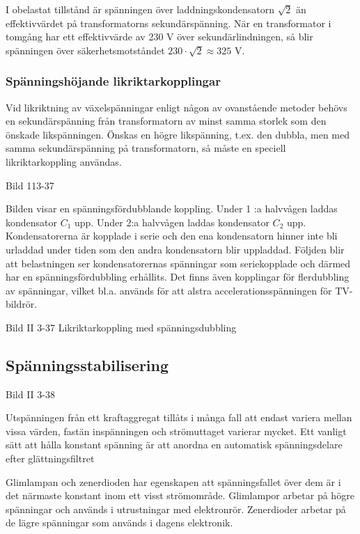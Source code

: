 I obelastat tillstånd är spänningen över laddningskondensatorn
\(\sqrt{2}\) än effektivvärdet på transformatorns
sekundärspänning. När en transformator i tomgång har ett effektivvärde
av 230 V över sekundärlindningen, så blir spänningen över
säkerhetsmotståndet \(230\cdot\sqrt{2} \approx 325\) V.

\subsubsection{Spänningshöjande likriktarkopplingar}

Vid likriktning av växelspänningar enligt någon av ovanstående metoder
behövs en sekundärspänning från transformatorn av minst samma storlek
som den önskade likspänningen. Önskas en högre likspänning, t.ex. den
dubbla, men med samma sekundärspänning på transformatorn, så måste en
speciell likriktarkoppling användas.

Bild 113-37

Bilden visar en spänningsfördubblande koppling. Under 1 :a halvvågen
laddas kondensator \(C_1\) upp. Under 2:a halvvågen laddas kondensator
\(C_2\) upp. Kondensatorerna är kopplade i serie och den ena
kondensatorn hinner inte bli urladdad under tiden som den andra
kondensatorn blir uppladdad. Följden blir att belastningen ser
kondensatorernas spänningar som seriekopplade och därmed har en
spänningsfördubbling erhållits. Det finns även kopplingar för
flerdubbling av spänningar, vilket bl.a. används för att alstra
accelerationsspänningen för TV-bildrör.

Bild II 3-37 Likriktarkoppling med spänningsdubbling

\subsection{Spänningsstabilisering}

Bild II 3-38

Utspänningen från ett kraftaggregat tillåts i många fall att endast
variera mellan vissa värden, fastän inspänningen och strömuttaget
varierar mycket. Ett vanligt sätt att hålla konstant spänning är att
anordna en automatisk spänningsdelare efter glättningsfiltret

Glimlampan och zenerdioden har egenskapen att spänningsfallet över dem
är i det närmaste konstant inom ett visst strömområde. Glimlampor
arbetar på högre spänningar och används i utrustningar med
elektronrör. Zenerdioder arbetar på de lägre spänningar som används i
dagens elektronik.


